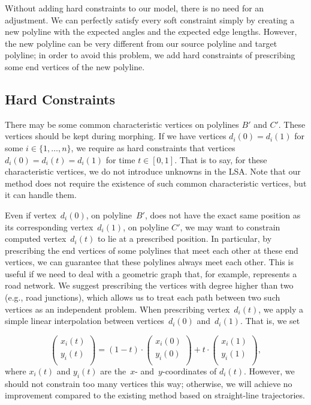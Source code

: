 Without adding hard constraints to our model, 
there is no need for an adjustment. 
We can perfectly satisfy every soft constraint 
simply by creating a new polyline with 
the expected angles and the expected edge lengths. 
However, the new polyline can be very different 
from our source polyline and target polyline;
in order to avoid this problem,
we add hard constraints of
prescribing some end vertices of the new polyline.

\subsection{Hard Constraints}
\label{sec:Morph_HardConstraints}

There may be some common characteristic vertices on 
polylines $B'$ and $C'$. 
These vertices should be kept during morphing. 
If we have vertices $d_{i}(0) = d_{i}(1)$
for some $i\in \{1,\ldots,n\}$, 
we require as hard constraints that vertices
$d_{i}(0) = d_{i}(t) = d_{i}(1)$ for time $t \in [0,1]$.
That is to say, for these characteristic vertices, 
we do not introduce unknowns in the LSA. 
Note that our method does not require 
the existence of such common characteristic vertices, 
but it can handle them.

Even if vertex~$d_{i}(0)$, on polyline~$B'$, 
does not have the exact same position 
as its corresponding vertex~$d_{i}(1)$, on polyline $C'$, 
we may want to constrain computed vertex~$d_{i}(t)$ 
to lie at a prescribed position. 
In particular, by prescribing the end vertices of 
some polylines that meet each other at these end vertices,
we can guarantee that these polylines always meet each other.
This is useful if we need to deal with a geometric graph
that, for example, represents a road network. 
We suggest prescribing the vertices 
with degree higher than two (e.g., road junctions), 
which allows us to treat each path between two such vertices 
as an independent problem. 
When prescribing vertex~$d_{i}(t)$, 
we apply a simple linear interpolation 
between vertices~$d_{i}(0)$ and~$d_{i}(1)$. 
That is, we set

\begin{equation}
\label{eq:Morph_HardConstraints}
\begin{pmatrix}
x_{i}(t) \\
y_{i}(t) \\
\end{pmatrix}
= (1 - t) \cdot
\begin{pmatrix}
x_{i}(0) \\
y_{i}(0) \\
\end{pmatrix}
+ t \cdot
\begin{pmatrix}
x_{i}(1) \\
y_{i}(1) \\
\end{pmatrix}, \nonumber
\end{equation}
where $x_{i}(t)$ and $y_{i}(t)$ are 
the~$x$- and~$y$-coordinates of $d_{i}(t)$. 
However, we should not constrain too many vertices this way;
otherwise, we will achieve no improvement compared to 
the existing method based on straight-line trajectories.

